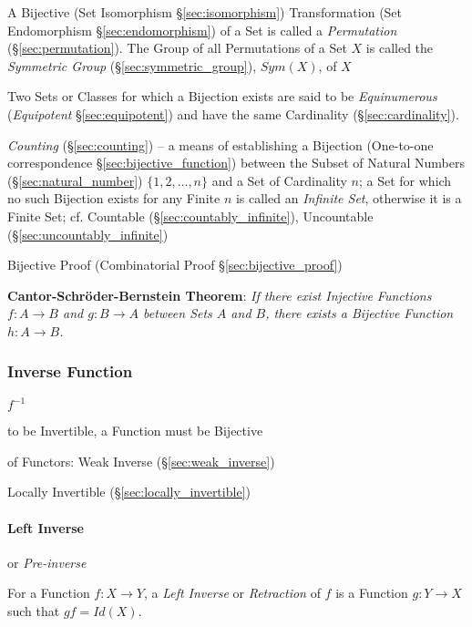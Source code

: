 A Bijective (Set Isomorphism \S\ref{sec:isomorphism}) Transformation (Set
Endomorphism \S\ref{sec:endomorphism}) of a Set is called a \emph{Permutation}
(\S\ref{sec:permutation}). The Group of all Permutations of a Set $X$ is called
the \emph{Symmetric Group} (\S\ref{sec:symmetric_group}), $Sym(X)$, of $X$

Two Sets or Classes for which a Bijection exists are said to be
\emph{Equinumerous} (\emph{Equipotent} \S\ref{sec:equipotent}) and have the same
Cardinality (\S\ref{sec:cardinality}).

\fist \emph{Counting} (\S\ref{sec:counting}) -- a means of establishing a
Bijection (One-to-one correspondence \S\ref{sec:bijective_function}) between the
Subset of Natural Numbers (\S\ref{sec:natural_number}) $\{1,2,\ldots,n\}$ and a
Set of Cardinality $n$; a Set for which no such Bijection exists for any Finite
$n$ is called an \emph{Infinite Set}, otherwise it is a Finite Set;
cf. Countable (\S\ref{sec:countably_infinite}), Uncountable
(\S\ref{sec:uncountably_infinite})

\fist Bijective Proof (Combinatorial Proof \S\ref{sec:bijective_proof})

\textbf{Cantor-Schr\"oder-Bernstein Theorem}: \emph{If there exist Injective
  Functions $f : A \to B$ and $g : B \to A$ between Sets $A$ and
  $B$, there exists a Bijective Function $h : A \to B$.}



\subsubsection{Inverse Function}\label{sec:inverse_function}

$f^{-1}$

to be Invertible, a Function must be Bijective

of Functors: Weak Inverse (\S\ref{sec:weak_inverse})

Locally Invertible (\S\ref{sec:locally_invertible})



\paragraph{Left Inverse}\label{sec:left_inverse}\hfill

or \emph{Pre-inverse}

For a Function $f: X \to Y$, a \emph{Left Inverse} or
\emph{Retraction} of $f$ is a Function $g: Y \to X$ such that
$gf = Id(X)$.



